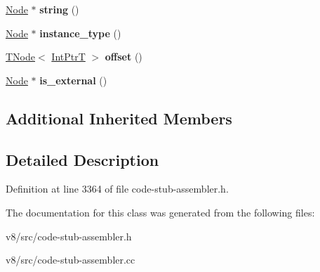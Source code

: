 \begin{DoxyCompactItemize}
\mbox{\hyperlink{classv8_1_1internal_1_1compiler_1_1Node}{Node}} $\ast$ {\bfseries string} ()
\item 
\mbox{\label{classv8_1_1internal_1_1ToDirectStringAssembler_a35014962ca3b3c6e32ff33347acae52e}} 
\mbox{\hyperlink{classv8_1_1internal_1_1compiler_1_1Node}{Node}} $\ast$ {\bfseries instance\+\_\+type} ()
\item 
\mbox{\label{classv8_1_1internal_1_1ToDirectStringAssembler_adcd92f17fec933df137646600b9b7054}} 
\mbox{\hyperlink{classv8_1_1internal_1_1compiler_1_1TNode}{T\+Node}}$<$ \mbox{\hyperlink{structv8_1_1internal_1_1IntPtrT}{Int\+PtrT}} $>$ {\bfseries offset} ()
\item 
\mbox{\label{classv8_1_1internal_1_1ToDirectStringAssembler_a53911d60069cd0e62fea6a6df198c8f4}} 
\mbox{\hyperlink{classv8_1_1internal_1_1compiler_1_1Node}{Node}} $\ast$ {\bfseries is\+\_\+external} ()
\end{DoxyCompactItemize}
\subsection*{Additional Inherited Members}


\subsection{Detailed Description}


Definition at line 3364 of file code-\/stub-\/assembler.\+h.



The documentation for this class was generated from the following files\+:\begin{DoxyCompactItemize}
\item 
v8/src/code-\/stub-\/assembler.\+h\item 
v8/src/code-\/stub-\/assembler.\+cc\end{DoxyCompactItemize}
